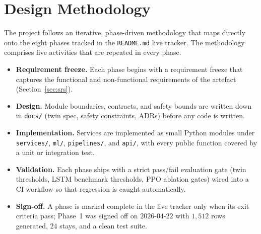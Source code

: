 \documentclass[12pt,a4paper,oneside]{report}
\begin{document}
\section{Design Methodology}
The project follows an iterative, phase-driven methodology that maps directly onto the eight phases tracked in the \texttt{README.md} live tracker. The methodology comprises five activities that are repeated in every phase.
\begin{itemize}[leftmargin=*]
  \item \textbf{Requirement freeze.} Each phase begins with a requirement freeze that captures the functional and non-functional requirements of the artefact (Section~\ref{sec:srs}).
  \item \textbf{Design.} Module boundaries, contracts, and safety bounds are written down in \texttt{docs/} (twin spec, safety constraints, ADRs) before any code is written.
  \item \textbf{Implementation.} Services are implemented as small Python modules under \texttt{services/}, \texttt{ml/}, \texttt{pipelines/}, and \texttt{api/}, with every public function covered by a unit or integration test.
  \item \textbf{Validation.} Each phase ships with a strict pass/fail evaluation gate (twin thresholds, LSTM benchmark thresholds, PPO ablation gates) wired into a CI workflow so that regression is caught automatically.
  \item \textbf{Sign-off.} A phase is marked complete in the live tracker only when its exit criteria pass; Phase~1 was signed off on $2026$-$04$-$22$ with $1{,}512$ rows generated, $24$ stays, and a clean test suite.
\end{itemize}
\end{document}
